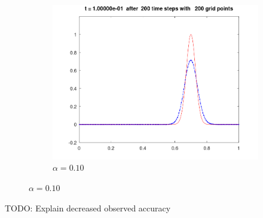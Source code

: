 \begin{solution}
\begin{figure}[h]
\begin{subfigure}[b]{0.45\textwidth}
            \includegraphics[width=\textwidth]{problem_3c_alpha-0.10.png}
            \caption{$\alpha = 0.10$}
        \end{subfigure}
    \end{figure}

    TODO: Explain decreased observed accuracy
    \ \\
\end{solution}